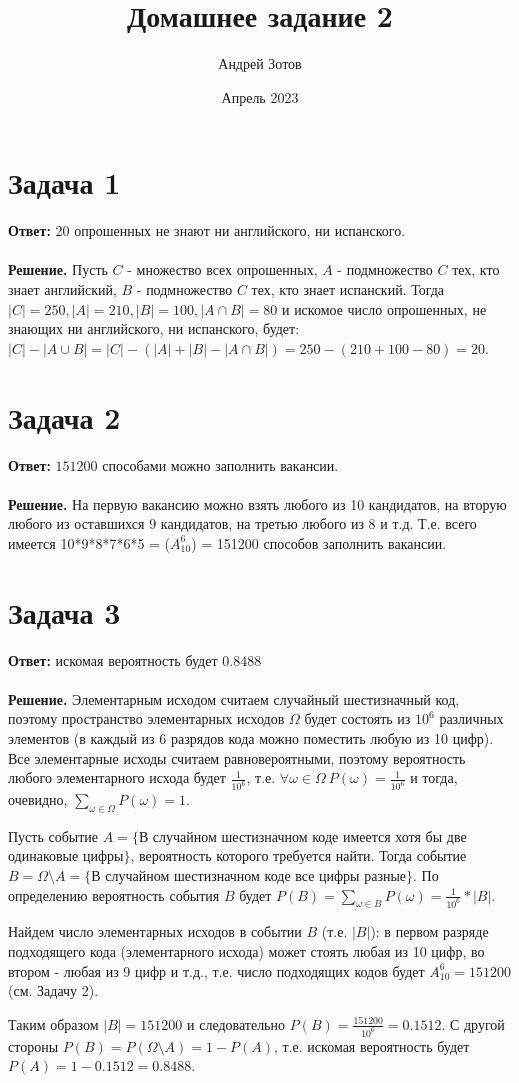 \documentclass{article}
\title{Домашнее задание 2}
\author{Андрей Зотов}
\date{Апрель 2023}
\begin{document}
\maketitle

\section*{Задача 1}
{\bf Ответ:} 20 опрошенных не знают ни английского, ни испанского.
\\
\\
{\bf Решение.} Пусть $C$ - множество всех опрошенных, $A$ - подмножество $C$ тех, кто знает английский, $B$ - подмножество $C$ тех, кто знает испанский. Тогда $|C|=250, |A|=210, |B|=100, |A\cap B|=80$ и искомое число опрошенных, не знающих ни английского, ни испанского, будет: $|C|-|A\cup B| = |C| - (|A| + |B| - |A\cap B|) = 250 - (210 + 100 - 80) = 20$.
\section*{Задача 2}
{\bf Ответ:} $151200$ способами можно заполнить вакансии.
\\
\\
{\bf Решение.} На первую вакансию можно взять любого из 10 кандидатов, на вторую любого из оставшихся 9 кандидатов, на третью любого из 8 и т.д. Т.е. всего имеется 10*9*8*7*6*5 = ($A_{10}^6$) = 151200 способов заполнить вакансии.
\section*{Задача 3}
{\bf Ответ:}  искомая вероятность будет 0.8488
\\
\\
{\bf Решение.} Элементарным исходом считаем случайный шестизначный код, поэтому пространство элементарных исходов $\Omega$ будет состоять из $10^6$ различных элементов (в каждый из 6 разрядов кода можно поместить любую из 10 цифр). Все элементарные исходы считаем равновероятными, поэтому вероятность любого элементарного исхода будет $\frac{1}{10^6}$, т.е. $\forall \omega \in \Omega\ P(\omega)=\frac{1}{10^6}$ и тогда, очевидно, $\sum_{\omega\in\Omega}P(\omega)=1$.
\par
Пусть событие $A = \{$В случайном шестизначном коде имеется хотя бы две одинаковые цифры$\}$, вероятность которого требуется найти. Тогда событие $B = \Omega\setminus A=\{$В случайном шестизначном коде все цифры разные$\}.$  По определению вероятность события $B$ будет $P(B)=\sum_{\omega\in B}P(\omega) = \frac{1}{10^6}*|B|$. 
\par
Найдем число элементарных исходов в событии $B$ (т.е. $|B|$): в первом разряде подходящего кода (элементарного исхода) может стоять любая из 10 цифр, во втором - любая из 9 цифр и т.д., т.е. число подходящих кодов будет $A_{10}^6=151200$ (см. Задачу 2).
\par
Таким образом $|B|=151200$  и следовательно $P(B)=\frac{151200}{10^6}=0.1512$. С другой стороны $P(B)=P(\Omega\setminus A)=1 - P(A)$, т.е. искомая вероятность будет $P(A)=1-0.1512=0.8488$.
\end{document}

